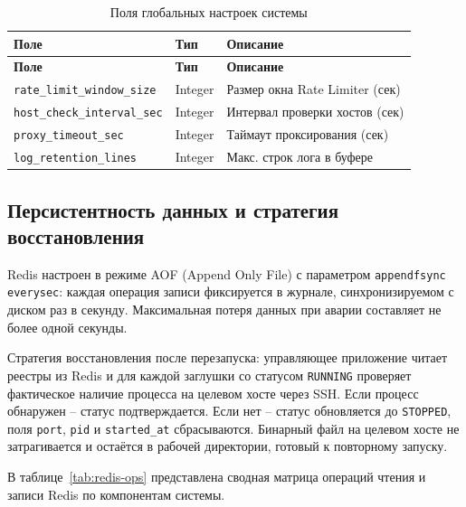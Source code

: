 \begin{xltabular}{\textwidth}{|l|l|X|}
\caption{Поля глобальных настроек системы} \label{tab:global-settings} \\
\hline
\textbf{Поле} & \textbf{Тип} & \textbf{Описание} \\ \hline
\endfirsthead
\hline
\textbf{Поле} & \textbf{Тип} & \textbf{Описание} \\ \hline
\endhead

\texttt{rate\_limit\_window\_size} & Integer & Размер окна Rate Limiter (сек) \\ \hline
\texttt{host\_check\_interval\_sec} & Integer & Интервал проверки хостов (сек) \\ \hline
\texttt{proxy\_timeout\_sec} & Integer & Таймаут проксирования (сек) \\ \hline
\texttt{log\_retention\_lines} & Integer & Макс. строк лога в буфере \\ \hline
\end{xltabular}

\subsection{Персистентность данных и стратегия восстановления}

Redis настроен в режиме AOF (Append Only File) с параметром \texttt{appendfsync everysec}: каждая операция записи фиксируется в журнале, синхронизируемом с диском раз в секунду. Максимальная потеря данных при аварии составляет не более одной секунды.

Стратегия восстановления после перезапуска: управляющее приложение читает реестры из Redis и для каждой заглушки со статусом \texttt{RUNNING} проверяет фактическое наличие процесса на целевом хосте через SSH. Если процесс обнаружен -- статус подтверждается. Если нет -- статус обновляется до \texttt{STOPPED}, поля \texttt{port}, \texttt{pid} и \texttt{started\_at} сбрасываются. Бинарный файл на целевом хосте не затрагивается и остаётся в рабочей директории, готовый к повторному запуску.

В таблице~\ref{tab:redis-ops} представлена сводная матрица операций чтения и записи Redis по компонентам системы.

